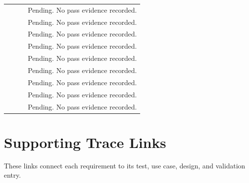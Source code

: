 \begin{tabularx}{\linewidth}{L{2.9cm}L{2.45cm}L{2.45cm}Y}
 &  &  & Pending. No pass evidence recorded.\\
 &  &  & Pending. No pass evidence recorded.\\
 &  &  & Pending. No pass evidence recorded.\\
 &  &  & Pending. No pass evidence recorded.\\
 &  &  & Pending. No pass evidence recorded.\\
 &  &  & Pending. No pass evidence recorded.\\
 &  &  & Pending. No pass evidence recorded.\\
 &  &  & Pending. No pass evidence recorded.\\
 &  &  & Pending. No pass evidence recorded.\\
\end{tabularx}
\normalsize

\section{Supporting Trace Links}
These links connect each requirement to its test, use case, design, and
validation entry.

